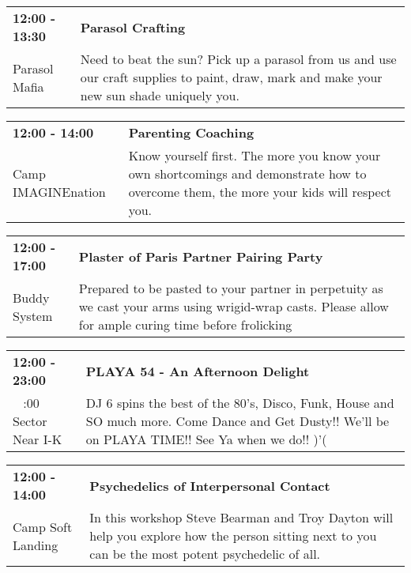\begin{tabular}{ p{1in} p{2.2in} }
    \textbf{12:00 - 13:30} & \textbf{Parasol Crafting} \\
    Parasol Mafia \newline  & Need to beat the sun? Pick up a parasol from us and use our craft supplies to paint, draw, mark and make your new sun shade uniquely you. \\
    \hline 
\end{tabular}
    
\begin{tabular}{ p{1in} p{2.2in} }
    \textbf{12:00 - 14:00} & \textbf{Parenting Coaching} \\
    Camp IMAGINEnation \newline  & Know yourself first. The more you know your own shortcomings and demonstrate how to overcome them, the more your kids will respect you. \\
    \hline 
\end{tabular}
    
\begin{tabular}{ p{1in} p{2.2in} }
    \textbf{12:00 - 17:00} & \textbf{Plaster of Paris Partner Pairing Party} \\
    Buddy System \newline  & Prepared to be pasted to your partner in perpetuity as we cast your arms using wrigid-wrap casts. Please allow for ample curing time before frolicking \\
    \hline 
\end{tabular}
    
\begin{tabular}{ p{1in} p{2.2in} }
    \textbf{12:00 - 23:00} & \textbf{PLAYA 54 - An Afternoon Delight} \\
    ~ \newline 9:00 Sector Near I-K & DJ 6 spins the best of the 80's, Disco, Funk, House and SO much more. Come Dance and Get Dusty!! We'll be on PLAYA TIME!! See Ya when we do!! )'( \\
    \hline 
\end{tabular}
    
\begin{tabular}{ p{1in} p{2.2in} }
    \textbf{12:00 - 14:00} & \textbf{Psychedelics of Interpersonal Contact} \\
    Camp Soft Landing \newline  & In this workshop Steve Bearman and Troy Dayton will help you explore how the person sitting next to you can be the most potent psychedelic of all. \\
    \hline 
\end{tabular}
    
